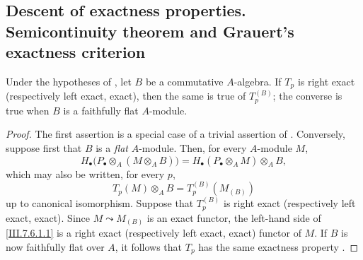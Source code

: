 \subsection{Descent of exactness properties. Semicontinuity theorem and
Grauert's exactness criterion}
\label{subsection:III.7.6}
\label{III.7.6}

\begin{proposition}[7.6.1]
\label{III.7.6.1}
Under the hypotheses of , let $B$ be a
commutative $A$-algebra.  If $T_p$ is right exact
\textup{(respectively} left exact, exact), then the same is true of
$T_p^{(B)}$; the converse is true when $B$ is a faithfully
flat $A$-module.
\end{proposition}

\begin{proof}
The first assertion is a special case of a trivial assertion
of .  Conversely, suppose first that $B$ is a
\emph{flat} $A$-module.  Then, for every $A$-module $M$,
\[
  H_\bullet\bigl(P_\bullet\otimes_A(M\otimes_A B)\bigr)
  =
  H_\bullet(P_\bullet\otimes_A M)\otimes_A B,
\]
which may also be written, for every $p$,
\[
  T_p(M)\otimes_A B
  =
  T_p^{(B)}(M_{(B)})
  \tag{7.6.1.1}\label{III.7.6.1.1}
\]
up to canonical isomorphism.  Suppose that $T_p^{(B)}$ is
right exact (respectively left exact, exact).  Since
$M\leadsto M_{(B)}$ is an exact functor, the left-hand side of
\eqref{III.7.6.1.1} is a right exact (respectively left exact,
exact) functor of $M$.  If $B$ is now faithfully flat over
$A$, it follows that $T_p$ has the same exactness property
.
\end{proof}

